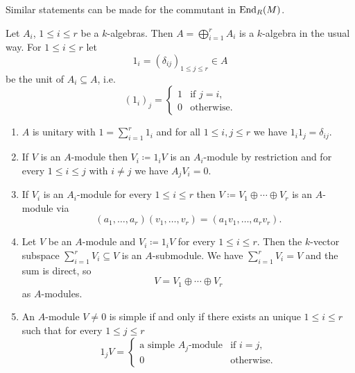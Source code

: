 \begin{rem}
 Similar statements can be made for the commutant in $\operatorname{End}_R(M)$.
\end{rem}


\begin{lem}\label{lem: modules over direct sum of algebras}
 Let $A_i$, $1 \leq i \leq r$ be a $k$-algebras. Then $A = \bigoplus_{i=1}^r A_i$ is a $k$-algebra in the usual way. For $1 \leq i \leq r$ let
 \[
  1_i = (\delta_{ij})_{1 \leq j \leq r} \in A
 \]
 be the unit of $A_i \subseteq A$, i.e.
 \[
  (1_i)_j =
  \begin{cases}
   1 & \text{if } j = i, \\
   0 & \text{otherwise}.
  \end{cases}
 \]
 \begin{enumerate}[label=\emph{\alph*}),leftmargin=*]
  \item
   $A$ is unitary with $1 = \sum_{i=1}^r 1_i$ and for all $1 \leq i,j \leq r$ we have $1_i 1_j = \delta_{ij}$.
  \item
   If $V$ is an $A$-module then $V_i \coloneqq 1_i V$ is an $A_i$-module by restriction and for every $1 \leq i \leq j$ with $i \neq j$ we have $A_j V_i = 0$.
  \item
   If $V_i$ is an $A_i$-module for every $1 \leq i \leq r$ then $V \coloneqq V_1 \oplus \dotsb \oplus V_r$ is an $A$-module via
   \[
    (a_1, \dotsc, a_r) (v_1, \dotsc, v_r) = (a_1 v_1, \dotsc, a_r v_r).
   \]
  \item
   Let $V$ be an $A$-module and $V_i \coloneqq 1_i V$ for every $1 \leq i \leq r$. Then the $k$-vector subspace \mbox{$\sum_{i=1}^r V_i \subseteq V$} is an $A$-submodule. We have $\sum_{i=1}^r V_i = V$ and the sum is direct, so
   \[
    V = V_1 \oplus \dotsb \oplus V_r
   \]
   as $A$-modules.
  \item
   An $A$-module $V \neq 0$ is simple if and only if there exists an unique $1 \leq i \leq r$ such that for every $1 \leq j \leq r$
   \[
    1_j V =
    \begin{cases}
     \text{a simple $A_j$-module} & \text{if } i = j, \\
                                0 & \text{otherwise}.
    \end{cases}
   \]
 \end{enumerate}
\end{lem}
